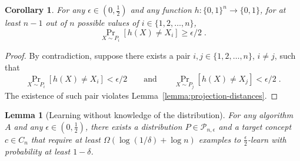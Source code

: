 \documentclass[12pt]{article}
\newtheorem{lemma}[proposition]{Lemma}
\newtheorem{corollary}[proposition]{Corollary}
\renewcommand{\P}{\mathcal{P}}
\begin{document}
\begin{corollary}
\label{corollary:projection-distances}
For any $\epsilon \in (0,\frac{1}{2})$ and any function $h:\{0,1\}^n \to \{0,1\}$,
for at least $n-1$ out of $n$ possible values of $i \in \{1,2,\dots,n\}$,
$$
\Pr_{X \sim P_i}[h(X) \neq X_i] \ge \epsilon/2 \; .
$$
\end{corollary}

\begin{proof}
By contradiction, suppose there exists a pair $i,j \in \{1,2,\dots,n\}$, $i \neq j$, such that
$$
\Pr_{X \sim P_i}[h(X) \neq X_i] < \epsilon/2 \qquad \text{and} \qquad \Pr_{X \sim P_j}[h(X) \neq X_j] < \epsilon/2 \; .
$$
The existence of such pair violates Lemma~\ref{lemma:projection-distances}.
\end{proof}


\begin{lemma}[Learning without knowledge of the distribution]
For any algorithm $A$ and any $\epsilon \in (0,\frac{1}{2})$,
there exists a distribution $P \in \P_{n,\epsilon}$
and a target concept $c \in C_n$ that require at least $\Omega(\log(1/\delta) + \log n)$
examples to $\frac{\epsilon}{2}$-learn with probability at least $1 - \delta$.
\end{lemma}
\end{document}
